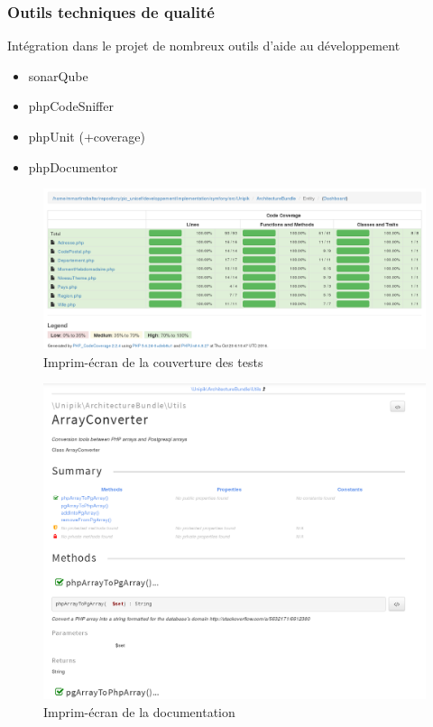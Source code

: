\speaker{\Matthieu}

\begin{frame}
\frametitle{Outils techniques de qualité}
\begin{block}{Intégration dans le projet de nombreux outils d'aide au développement}
	\begin{itemize}
		\item sonarQube
		\item phpCodeSniffer %
		\item phpUnit (+coverage) %
		\item phpDocumentor
	\end{itemize}
\end{block}
\end{frame}

\begin{frame}
      \begin{figure}[r]
		\includegraphics[scale=0.4]{images/coverage.png}
		\caption{Imprim-écran de la couverture des tests}
	  \end{figure}
\end{frame}

\begin{frame}
      \begin{figure}[r]
		\includegraphics[scale=0.2]{images/doc.png}
		\caption{Imprim-écran de la documentation}
	  \end{figure}
\end{frame}

